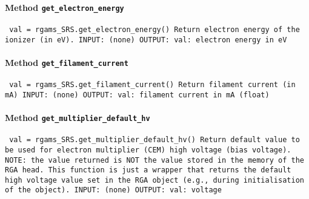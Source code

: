 \paragraph{Method \texttt{get_electron_energy}}
\vspace{1ex}
\texttt{\newline
val = rgams_SRS.get_electron_energy()\newline
\newline
Return electron energy of the ionizer (in eV).\newline
\newline
INPUT:\newline
(none)\newline
\newline
OUTPUT:\newline
val: electron energy in eV\newline
\newline
}

\paragraph{Method \texttt{get_filament_current}}
\vspace{1ex}
\texttt{\newline
val = rgams_SRS.get_filament_current()\newline
\newline
Return filament current (in mA)\newline
\newline
INPUT:\newline
(none)\newline
\newline
OUTPUT:\newline
val: filament current in mA (float)\newline
\newline
}

\paragraph{Method \texttt{get_multiplier_default_hv}}
\vspace{1ex}
\texttt{\newline
val = rgams_SRS.get_multiplier_default_hv()\newline
\newline
Return default value to be used for electron multiplier (CEM) high voltage (bias voltage).\newline
NOTE: the value returned is NOT the value stored in the memory of the RGA head. This function is just a wrapper that returns the default high voltage value set in the RGA object (e.g., during initialisation of the object).\newline
\newline
INPUT:\newline
(none)\newline
\newline
OUTPUT:\newline
val: voltage\newline
\newline
}

